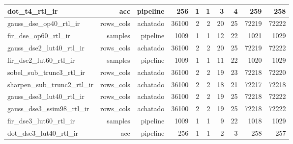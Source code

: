 \begin{table}[htbp]
\begin{tabular}{|l|r|r|r|r|r|r|r|r|r|}
dot\_t4\_rtl\_ir & acc & pipeline & 256 & 1 & 1 & 3 & 4 & 259 & 258 \\ \hline
gauss\_dse\_op40\_rtl\_ir & rows\_cols & achatado & 36100 & 2 & 2 & 20 & 25 & 72219 & 72222 \\ \hline
fir\_dse\_op60\_rtl\_ir & samples & pipeline & 1009 & 1 & 1 & 12 & 22 & 1021 & 1029 \\ \hline
gauss\_dse2\_lut40\_rtl\_ir & rows\_cols & achatado & 36100 & 2 & 2 & 20 & 25 & 72219 & 72222 \\ \hline
fir\_dse2\_lut60\_rtl\_ir & samples & pipeline & 1009 & 1 & 1 & 11 & 22 & 1020 & 1029 \\ \hline
sobel\_sub\_trunc3\_rtl\_ir & rows\_cols & achatado & 36100 & 2 & 2 & 19 & 23 & 72218 & 72220 \\ \hline
sharpen\_sub\_trunc2\_rtl\_ir & rows\_cols & achatado & 36100 & 2 & 2 & 18 & 21 & 72217 & 72218 \\ \hline
gauss\_dse3\_lut40\_rtl\_ir & rows\_cols & achatado & 36100 & 2 & 2 & 19 & 25 & 72218 & 72222 \\ \hline
gauss\_dse3\_ssim98\_rtl\_ir & rows\_cols & achatado & 36100 & 2 & 2 & 19 & 25 & 72218 & 72222 \\ \hline
fir\_dse3\_lut60\_rtl\_ir & samples & pipeline & 1009 & 1 & 1 & 9 & 22 & 1018 & 1029 \\ \hline
dot\_dse3\_lut40\_rtl\_ir & acc & pipeline & 256 & 1 & 1 & 2 & 3 & 258 & 257 \\ \hline
\end{tabular}
\end{table}

